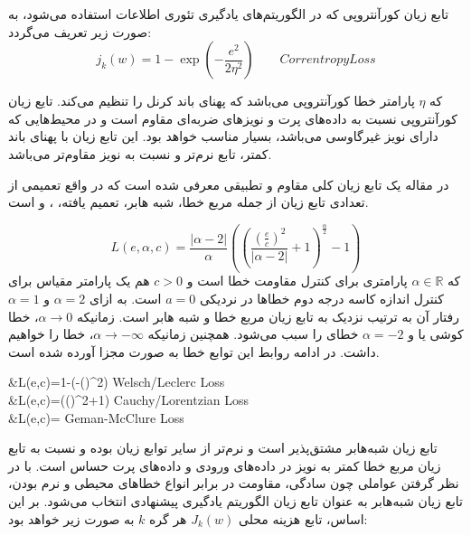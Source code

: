 تابع زیان کورآنتروپی \cite{CorrEntrop} که در الگوریتم‌های یادگیری تئوری اطلاعات استفاده می‌شود، به صورت زیر تعریف می‌گردد: 
\begin{equation}
	j_k (w)=1-\exp⁡(- \frac{e^2}{2\eta^2})      \qquad Correntropy Loss
\end{equation}

که $\eta$ پارامتر خطا کورآنتروپی می‌باشد که پهنای باند کرنل را تنظیم می‌کند. تایع زیان کورآنتروپی نسبت به داده‌های پرت و نویزهای ضربه‌ای مقاوم است و در محیط‌هایی که دارای نویز غیرگاوسی می‌باشد، بسیار مناسب خواهد بود. این تابع زیان با پهنای باند کمتر، تابع‌ نرم‌تر و نسبت به نویز مقاوم‌تر می‌باشد. 

در مقاله \cite{Barron17} یک تابع زیان کلی مقاوم و تطبیقی معرفی شده است که در واقع تعمیمی از تعدادی تابع زیان از جمله مربع خطا، شبه هابر،  تعمیم یافته،   \cite{CauchyLoss}،  \cite{WelschLoss}و  \cite{GemanLoss} است. 

\begin{equation}\label{GenralLosses}
	L(e,\alpha,c)=\frac{|\alpha-2|}{\alpha}\left((\frac{(\frac{e}{c})^2}{|\alpha-2|}+1)^{\frac{\alpha}{2}}-1\right) 
\end{equation}
که $\alpha\in \mathbb{R}$ پارامتری برای کنترل مقاومت خطا است و $c>0$ هم یک پارامتر مقیاس برای کنترل اندازه کاسه درجه دوم خطاها در نردیکی $a=0$ است. به ازای $\alpha=2$ و $\alpha=1$ رفتار آن به ترتیب نزدیک به تابع زیان مربع خطا و شبه هابر است. زمانیکه $\alpha\rightarrow 0$، خطا کوشی یا  و $\alpha=-2$ خطای  را سبب می‌شود. همچنین زمانیکه $\alpha\rightarrow -\infty$، خطا  را خواهیم داشت.  در ادامه روابط این توابع خطا به صورت مجزا آورده شده است.
	\begin{flalign}
	&L(e,c)=1-\exp(-()^2) \qquad Welsch/Leclerc \quad Loss\\
	&L(e,c)=\log(()^2+1) \qquad \quad Cauchy/Lorentzian \quad Loss\\
	&L(e,c)= \qquad \quad \qquad Geman-McClure \quad Loss
\end{flalign} 
تابع زیان شبه‌هابر مشتق‌پذیر است و نرم‌تر از سایر توابع زیان بوده و نسبت به تابع زیان مربع خطا کمتر به نویز در داده‌های ورودی و داده‌های پرت حساس است. با در نظر گرفتن عواملی چون سادگی، مقاومت در برابر انواع خطاهای محیطی و نرم بودن، تابع زیان شبه‌هابر به عنوان تابع زیان الگوریتم یادگیری پیشنهادی انتخاب می‌شود. بر این اساس، تابع هزینه محلی $J_k(w)$ هر گره $k$ به صورت زیر خواهد بود:

